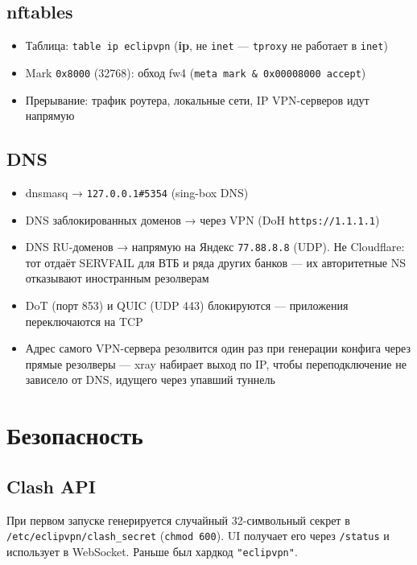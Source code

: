 \documentclass[11pt,a4paper]{article}
\begin{document}
\subsection{nftables}

\begin{itemize}
\item Таблица: \texttt{table ip eclipvpn} (\textbf{ip}, не \texttt{inet} — \texttt{tproxy} не работает в \texttt{inet})
\item Mark \texttt{0x8000} (32768): обход fw4 (\texttt{meta mark \& 0x00008000 accept})
\item Прерывание: трафик роутера, локальные сети, IP VPN-серверов идут напрямую
\end{itemize}

\subsection{DNS}

\begin{itemize}
\item dnsmasq → \texttt{127.0.0.1\#5354} (sing-box DNS)
\item DNS заблокированных доменов → через VPN (DoH \texttt{https://1.1.1.1})
\item DNS RU-доменов → напрямую на Яндекс \texttt{77.88.8.8} (UDP). Не Cloudflare: тот отдаёт SERVFAIL для ВТБ и ряда других банков --- их авторитетные NS отказывают иностранным резолверам
\item DoT (порт 853) и QUIC (UDP 443) блокируются — приложения переключаются на TCP
\item Адрес самого VPN-сервера резолвится один раз при генерации конфига через прямые резолверы --- xray набирает выход по IP, чтобы переподключение не зависело от DNS, идущего через упавший туннель
\end{itemize}

\section{Безопасность}

\subsection{Clash API}

При первом запуске генерируется случайный 32-символьный секрет в \texttt{/etc/eclipvpn/clash\_secret} (\texttt{chmod 600}). UI получает его через \texttt{/status} и использует в WebSocket. Раньше был хардкод \texttt{"eclipvpn"}.
\end{document}
